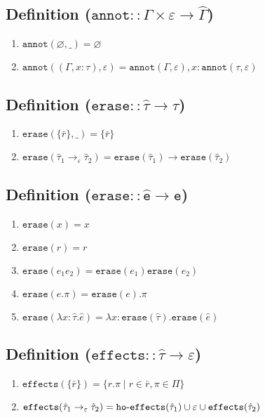 \documentclass{llncs}
\newcommand{\keywadj}[1]{\mathtt{#1}}
\newcommand{\kwa}[1]{\keywadj{ #1 }}
\newcommand{\hyphen}{\hbox{-}}
\begin{document}
\subsection*{Definition ($\kwa{annot :: \Gamma \times \varepsilon \rightarrow \hat \Gamma}$)}

\begin{enumerate}
	\item $\kwa{annot}(\varnothing, \_) = \varnothing$
	\item $\kwa{annot}((\Gamma, x: \tau), \varepsilon) = \kwa{annot}(\Gamma, \varepsilon), x: \kwa{annot}(\tau, \varepsilon)$
\end{enumerate}

\subsection*{Definition ($\kwa{erase :: \hat \tau \rightarrow \tau}$)}

\begin{enumerate}
	\item $\kwa{erase}(\{ \bar r \}, \_) = \{ \bar r \}$
	\item $\kwa{erase}(\hat \tau_1 \rightarrow_{\varepsilon} \hat \tau_2) = \kwa{erase}(\hat \tau_1) \rightarrow \kwa{erase}(\hat \tau_2)$
\end{enumerate}

\subsection*{Definition ($\kwa{erase :: \hat e \rightarrow e}$)}

\begin{enumerate}
	\item $\kwa{erase}(x) = x$
	\item $\kwa{erase}(r) = r$
	\item $\kwa{erase}(e_1 e_2) = \kwa{erase}(e_1) \kwa{erase}(e_2)$
	\item $\kwa{erase}(e.\pi) = \kwa{erase}(e).\pi$
	\item $\kwa{erase}(\lambda x: \hat \tau.\hat e) = \lambda x: \kwa{erase}(\hat \tau).\kwa{erase}(\hat e)$
\end{enumerate}

\subsection*{Definition ($\kwa{effects :: \hat \tau \rightarrow \varepsilon}$)}

\begin{enumerate}
	\item $\kwa{effects}(\{ \bar r \}) = \{ r.\pi \mid r \in \bar r, \pi \in \Pi \}$
	\item $\kwa{effects}(\hat \tau_1 \rightarrow_{\varepsilon} \hat \tau_2) = \kwa{ho \hyphen effects}(\hat \tau_1) \cup \varepsilon \cup \kwa{effects}(\hat \tau_2)$
\end{enumerate}
\end{document}
